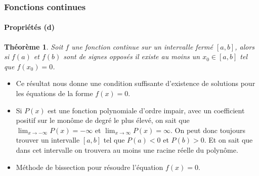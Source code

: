 \documentclass[10pt,notheorems]{beamer}
\theoremstyle{plain}
\newtheorem{theorem}{Théorème}
\theoremstyle{definition} %
\begin{document}
\begin{frame}
  \frametitle{Fonctions continues}
  \framesubtitle{Propriétés (d)}

  \begin{theorem}
    Soit $f$ une fonction continue sur un intervalle fermé $[a,b]$, alors si $f(a)$ et $f(b)$ sont de signes opposés il existe au moins un $x_0\in[a,b]$ tel que $f(x_0)=0$.
  \end{theorem}

  \bigskip

  \begin{itemize}

  \item Ce résultat nous donne une condition suffisante d'existence de solutions pour les équations de la forme $f(x)=0$.\newline

  \item Si $P(x)$ est une fonction polynomiale d'ordre impair, avec un coefficient positif sur le monôme de degré le plus élevé, on sait que $\lim_{x\rightarrow -\infty}P(x) = -\infty $ et $\lim_{x\rightarrow \infty}P(x) = \infty $. On peut donc toujours trouver un intervalle $[a,b]$ tel que $P(a)<0$ et $P(b)>0$. Et on sait que dans cet intervalle on trouvera au moins une racine réelle du polynôme.\newline

  \item Méthode de bissection pour résoudre l'équation $f(x)=0$.

  \end{itemize}

\end{frame}
\end{document}
